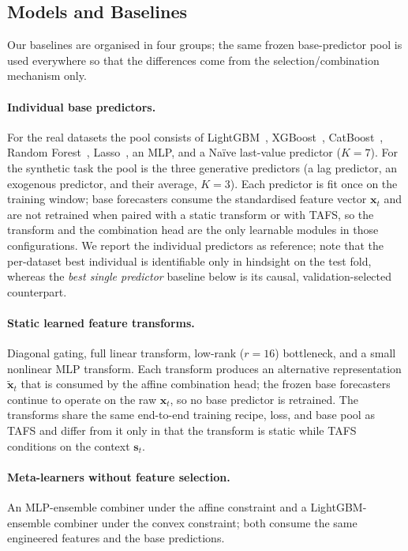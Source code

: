 \documentclass[journal]{IEEEtran}
\begin{document}
\subsection{Models and Baselines}

Our baselines are organised in four groups; the same frozen base-predictor pool is used everywhere so that the differences come from the selection/combination mechanism only.

\paragraph*{Individual base predictors.} For the real datasets the pool consists of LightGBM~\cite{ke2017lightgbm}, XGBoost~\cite{chen2016xgboost}, CatBoost~\cite{prokhorenkova2018catboost}, Random Forest~\cite{breiman2001randomforest}, Lasso~\cite{tibshirani1996lasso}, an MLP, and a Na\"ive last-value predictor ($K{=}7$). For the synthetic task the pool is the three generative predictors (a lag predictor, an exogenous predictor, and their average, $K{=}3$). Each predictor is fit once on the training window; base forecasters consume the standardised feature vector $\mathbf{x}_t$ and are not retrained when paired with a static transform or with TAFS, so the transform and the combination head are the only learnable modules in those configurations. We report the individual predictors as reference; note that the per-dataset best individual is identifiable only in hindsight on the test fold, whereas the \emph{best single predictor} baseline below is its causal, validation-selected counterpart.

\paragraph*{Static learned feature transforms.} Diagonal gating, full linear transform, low-rank ($r{=}16$) bottleneck, and a small nonlinear MLP transform. Each transform produces an alternative representation $\tilde{\mathbf{x}}_t$ that is consumed by the affine combination head; the frozen base forecasters continue to operate on the raw $\mathbf{x}_t$, so no base predictor is retrained. The transforms share the same end-to-end training recipe, loss, and base pool as TAFS and differ from it only in that the transform is static while TAFS conditions on the context $\mathbf{s}_t$.

\paragraph*{Meta-learners without feature selection.} An MLP-ensemble combiner under the affine constraint and a LightGBM-ensemble combiner under the convex constraint; both consume the same engineered features and the base predictions.
\end{document}
